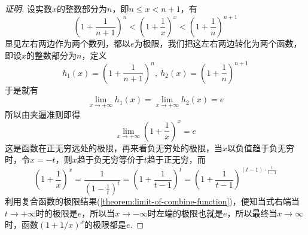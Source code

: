 \begin{proof}[证明]
  设实数$x$的整数部分为$n$，即$n \leqslant x < n+1$，有
  \[ \left( 1+\frac{1}{n+1} \right)^n < \left( 1+\frac{1}{x} \right)^x < \left( 1+\frac{1}{n} \right)^{n+1} \]
  显见左右两边作为两个数列，都以$e$为极限，我们把这左右两边转化为两个函数，即设$x$的整数部分为$n$，定义
  \[ h_1(x) =  \left( 1+\frac{1}{n+1} \right)^n, \ h_2(x)=\left( 1+\frac{1}{n} \right)^{n+1} \]
  于是就有
  \[ \lim_{x \to +\infty} h_1(x) = \lim_{x \to +\infty} h_2(x) = e \]
  所以由夹逼准则即得
  \[ \lim_{x \to +\infty} \left( 1+\frac{1}{x} \right)^x = e \]
  这是函数在正无穷远处的极限，再来看负无穷处的极限，当$x$以负值趋于负无穷时，令$x=-t$，则$x$趋于负无穷等价于$t$趋于正无穷，而
  \[ \left( 1+\frac{1}{x} \right)^x = \frac{1}{\left( 1-\frac{1}{t} \right)^t} = \left( 1+\frac{1}{t-1} \right)^t = \left( 1+\frac{1}{t-1} \right)^{(t-1) \cdot \frac{t}{t-1}} \]
  利用复合函数的极限结果(\autoref{theorem:limit-of-combine-function})，便知当式右端当$t \to +\infty$时的极限是$e$，所以当$x \to -\infty$时左端的极限也就是$e$，所以最终当$x \to \infty$时，函数$(1+1/x)^x$的极限都是$e$.
\end{proof}

